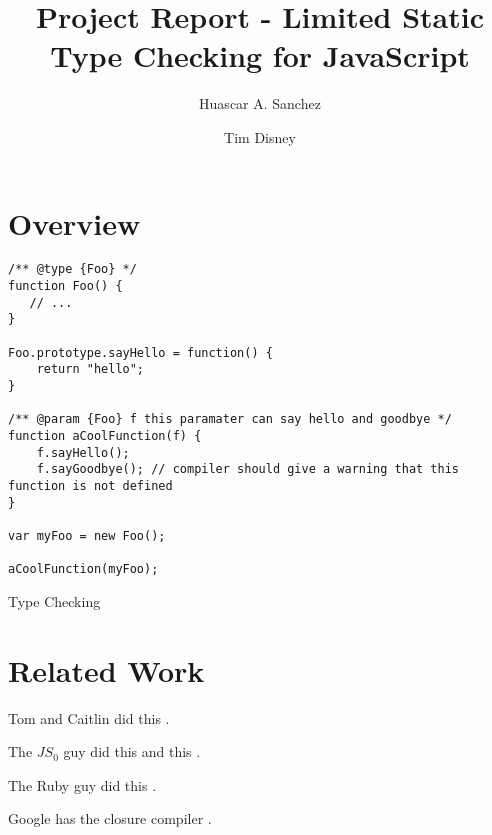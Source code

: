 \documentclass{article}
\begin{document}
\title{Project Report - Limited Static Type Checking for JavaScript}
\author{Huascar A. Sanchez \and Tim Disney}

\maketitle

\lstset{showstringspaces=false}

\section{Overview}

\begin{program}
\begin{verbatim}
/** @type {Foo} */
function Foo() {
   // ...
}

Foo.prototype.sayHello = function() {
    return "hello";
}

/** @param {Foo} f this paramater can say hello and goodbye */
function aCoolFunction(f) {
    f.sayHello();
    f.sayGoodbye(); // compiler should give a warning that this function is not defined
}

var myFoo = new Foo();

aCoolFunction(myFoo);
\end{verbatim}
\caption{Type Checking}
\end{program}

\section{Related Work}

Tom and Caitlin did this \cite{fwjsStruct}.

The $JS_0$ guy did this \cite{typeinferenceforjavascriptEcoop} and this \cite{typecheckingforjavascript}.

The Ruby guy did this \cite{typecheckingruby}.

Google has the closure compiler \cite{closureCompiler}.



\end{document}
